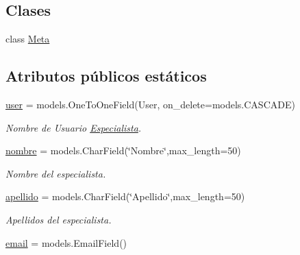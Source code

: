 \subsection*{Clases}
\begin{DoxyCompactItemize}
\item 
class \hyperlink{classappEmotionIOT_1_1models_1_1Especialista_1_1Meta}{Meta}
\end{DoxyCompactItemize}
\subsection*{Atributos públicos estáticos}
\begin{DoxyCompactItemize}
\item 
\hyperlink{classappEmotionIOT_1_1models_1_1Especialista_aafd41c8c0360df5a71c6dee38c9d52a6}{user} = models.\+One\+To\+One\+Field(User, on\+\_\+delete=models.\+C\+A\+S\+C\+A\+DE)\hypertarget{classappEmotionIOT_1_1models_1_1Especialista_aafd41c8c0360df5a71c6dee38c9d52a6}{}\label{classappEmotionIOT_1_1models_1_1Especialista_aafd41c8c0360df5a71c6dee38c9d52a6}

\begin{DoxyCompactList}\small\item\em Nombre de Usuario \hyperlink{classappEmotionIOT_1_1models_1_1Especialista}{Especialista}. \end{DoxyCompactList}\item 
\hyperlink{classappEmotionIOT_1_1models_1_1Especialista_a535c94931507d653833bf790178f039e}{nombre} = models.\+Char\+Field(\char`\"{}Nombre\char`\"{},max\+\_\+length=50)\hypertarget{classappEmotionIOT_1_1models_1_1Especialista_a535c94931507d653833bf790178f039e}{}\label{classappEmotionIOT_1_1models_1_1Especialista_a535c94931507d653833bf790178f039e}

\begin{DoxyCompactList}\small\item\em Nombre del especialista. \end{DoxyCompactList}\item 
\hyperlink{classappEmotionIOT_1_1models_1_1Especialista_a5e6ad86e8d169d62705f46b807f234c2}{apellido} = models.\+Char\+Field(\char`\"{}Apellido\char`\"{},max\+\_\+length=50)\hypertarget{classappEmotionIOT_1_1models_1_1Especialista_a5e6ad86e8d169d62705f46b807f234c2}{}\label{classappEmotionIOT_1_1models_1_1Especialista_a5e6ad86e8d169d62705f46b807f234c2}

\begin{DoxyCompactList}\small\item\em Apellidos del especialista. \end{DoxyCompactList}\item 
\hyperlink{classappEmotionIOT_1_1models_1_1Especialista_a392bd83ee1ad026bd7b7fd79467cef73}{email} = models.\+Email\+Field()\hypertarget{classappEmotionIOT_1_1models_1_1Especialista_a392bd83ee1ad026bd7b7fd79467cef73}{}\label{classappEmotionIOT_1_1models_1_1Especialista_a392bd83ee1ad026bd7b7fd79467cef73}


\end{DoxyCompactItemize}
